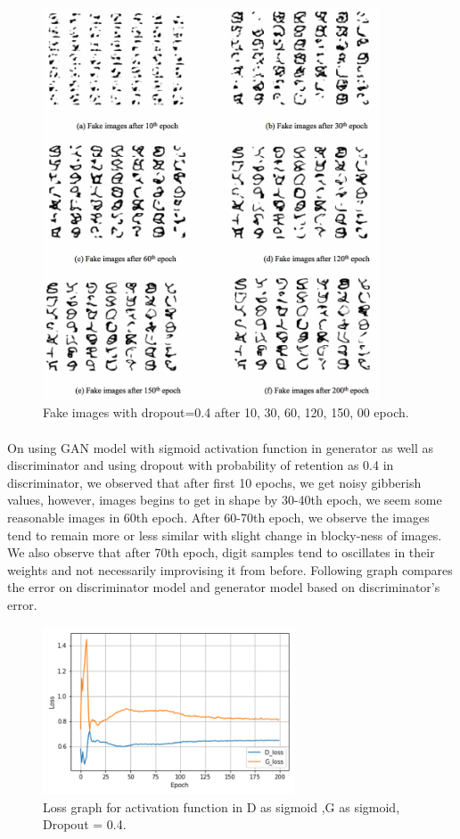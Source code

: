 \documentclass{article}
\begin{document}
\begin{figure}[H]
	\centering
	\includegraphics[width=10cm]{figs/Picture4}
	\caption{Fake images with dropout=0.4 after 10, 30, 60, 120, 150, 00 epoch.}
\end{figure}

\paragraph{}
On using GAN model with sigmoid activation function in generator as well as discriminator and using dropout with probability of retention as 0.4 in discriminator, we observed that after first 10 epochs, we get noisy gibberish values, however, images begins to get in shape by 30-40th epoch, we seem some reasonable images in 60th epoch. After 60-70th epoch, we observe the images tend to remain more or less similar with slight change in blocky-ness of images. We also observe that after 70th epoch, digit samples tend to oscillates in their weights and not necessarily improvising it from before. 
Following graph compares the error on discriminator model and generator model based on discriminator’s error.

\begin{figure}[H]
	\centering
	\includegraphics[width=7.5cm]{figs/Picture5}
	\caption{Loss graph for activation function in D as sigmoid ,G as sigmoid, Dropout = 0.4.}
\end{figure}
\end{document}

